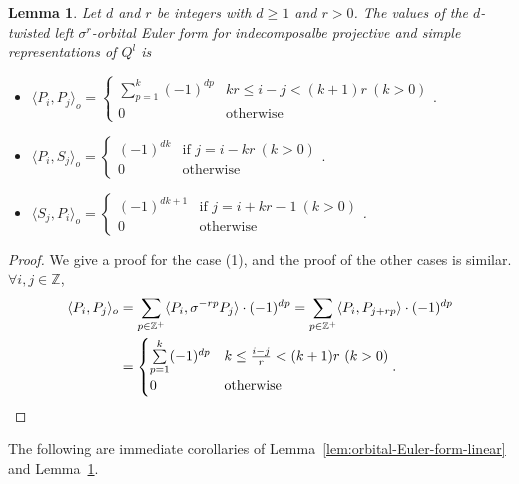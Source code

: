 \documentclass[reqno,12pt,a4paper]{amsart}
\newtheorem{lemma}[theorem]{Lemma}
\theoremstyle{remark}
\theoremstyle{definition}
\numberwithin{equation}{section}
\begin{document}
\begin{lemma}
	\label{lem:orbital-Euler-form-linear-projectives}
	Let $d$ and $r$ be integers with $d\geq 1$ and $r>0$.
	The values of the $d$-twisted left $\sigma^r$-orbital Euler form for indecomposalbe projective and simple representations of $Q^l$ is
	\begin{itemize}
		\item[(1)]
		$\langle P_i,P_j\rangle_o=\begin{cases} \sum\limits_{p=1}^{k}(-1)^{dp} &  kr\leq i-j<(k+1)r~(k>0)\\ 0 &\text{otherwise}\end{cases}.$ 
		\item[(2)] $
		\langle P_i,S_j\rangle_o=\begin{cases}
			(-1)^{dk} & \text{if }j=i-kr~(k>0)\\
			0 & \text{otherwise}
		\end{cases}.
		$
		\item[(3)]$
		\langle S_j,P_i\rangle_o=\begin{cases}
			(-1)^{dk+1} & \text{if }j=i+kr-1~(k>0)\\
			0 & \text{otherwise}
		\end{cases}$.
	\end{itemize}
\end{lemma}
\begin{proof}
	We give a proof for the case (1), and the proof of the other cases is similar.
	$\forall i, j \in \mathbb{Z}$, 
	\begin{align*}
		\langle P_i,P_j\rangle_o &=\sum_{p\in \mathbb{Z}^+}\langle P_i,\sigma^{-rp}P_{j}\rangle\cdot(-1)^{dp}=\sum_{p\in \mathbb{Z}^+}\langle P_i,P_{j+rp}\rangle\cdot(-1)^{dp}\\
		&=\begin{cases} \sum\limits_{p=1}^{k}(-1)^{dp} & k\leq \frac{i-j}{r}<(k+1)r~(k>0)\\ 0 &\text{otherwise}\end{cases}.
		\qedhere
	\end{align*}
\end{proof} 

The following are immediate corollaries of Lemma~\ref{lem:orbital-Euler-form-linear} and Lemma~\ref{lem:orbital-Euler-form-linear-projectives}. 
\end{document}
